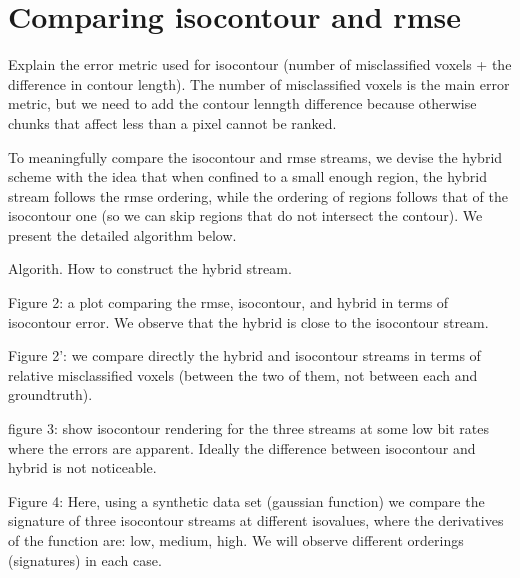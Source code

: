 
\section{Comparing isocontour and rmse}
Explain the error metric used for isocontour (number of misclassified voxels + the difference in contour length). The number of misclassified voxels is the main error metric, but we need to add the contour lenngth difference because otherwise chunks that affect less than a pixel cannot be ranked.

To meaningfully compare the isocontour and rmse streams, we devise the hybrid scheme with the idea that when confined to a small enough region, the hybrid stream follows the rmse ordering, while the ordering of regions follows that of the isocontour one (so we can skip regions that do not intersect the contour). We present the detailed algorithm below.

Algorith. How to construct the hybrid stream.

Figure 2: a plot comparing the rmse, isocontour, and hybrid in terms of isocontour error. We observe that the hybrid is close to the isocontour stream.

Figure 2': we compare directly the hybrid and isocontour streams in terms of relative misclassified voxels (between the two of them, not between each and groundtruth).

figure 3: show isocontour rendering for the three streams at some low bit rates where the errors are apparent. Ideally the difference between isocontour and hybrid is not noticeable.


Figure 4:
Here, using a synthetic data set (gaussian function) we compare the signature of three isocontour streams at different isovalues, where the derivatives of the function are: low, medium, high. We will observe different orderings (signatures) in each case.

